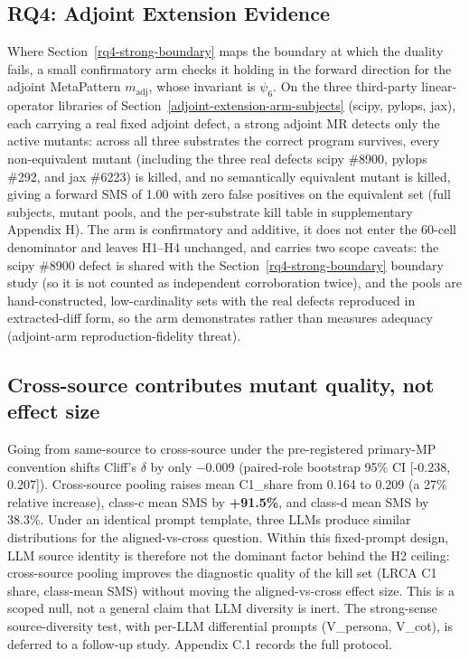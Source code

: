 \documentclass[manuscript,screen,review]{acmart}
\begin{document}
\subsection{RQ4: Adjoint Extension Evidence}\label{rq4-adjoint-extension-arm}

Where Section~\ref{rq4-strong-boundary} maps the boundary at which the duality fails, a small
confirmatory arm checks it holding in the forward direction for the
adjoint MetaPattern $m_{\mathrm{adj}}$, whose invariant is $\psi_6$. On the three third-party linear-operator libraries
of Section~\ref{adjoint-extension-arm-subjects} (scipy, pylops, jax), each carrying a real fixed adjoint defect, a
strong adjoint MR detects only the active mutants: across all three
substrates the correct program survives, every non-equivalent mutant
(including the three real defects scipy \#8900, pylops \#292, and jax
\#6223) is killed, and no semantically equivalent mutant is killed, giving
a forward SMS of 1.00 with zero false positives on the equivalent set
(full subjects, mutant pools, and the per-substrate kill table in
supplementary Appendix H). The arm is confirmatory and additive, it
does not enter the 60-cell denominator and leaves H1--H4 unchanged, and
carries two scope caveats: the scipy \#8900 defect is shared with the Section~\ref{rq4-strong-boundary}
boundary study (so it is not counted as independent corroboration twice),
and the pools are hand-constructed, low-cardinality sets with the real
defects reproduced in extracted-diff form, so the arm demonstrates rather
than measures adequacy (adjoint-arm reproduction-fidelity threat).


\label{discussion}

\subsection{Cross-source contributes mutant quality, not effect size}\label{cross-source-contributes-mutant-quality-not-effect-size}

Going from same-source to cross-source under the pre-registered
primary-MP convention shifts Cliff's $\delta$ by only $-$0.009 (paired-role
bootstrap 95\% CI {[}-0.238, 0.207{]}). Cross-source pooling raises mean C1\_share from 0.164 to 0.209 (a
27\% relative increase), class-c mean SMS by \textbf{+91.5\%}, and
class-d mean SMS by 38.3\%. Under an identical prompt template, three
LLMs produce similar distributions for the aligned-vs-cross question.
Within this fixed-prompt design, LLM source identity is therefore not the
dominant factor behind the H2 ceiling: cross-source pooling improves the
diagnostic quality of the kill set (LRCA C1 share, class-mean SMS)
without moving the aligned-vs-cross effect size. This is a scoped null,
not a general claim that LLM diversity is inert. The strong-sense
source-diversity test, with per-LLM differential prompts (V\_persona,
V\_cot), is deferred to a follow-up study. Appendix C.1 records the full
protocol.
\end{document}
